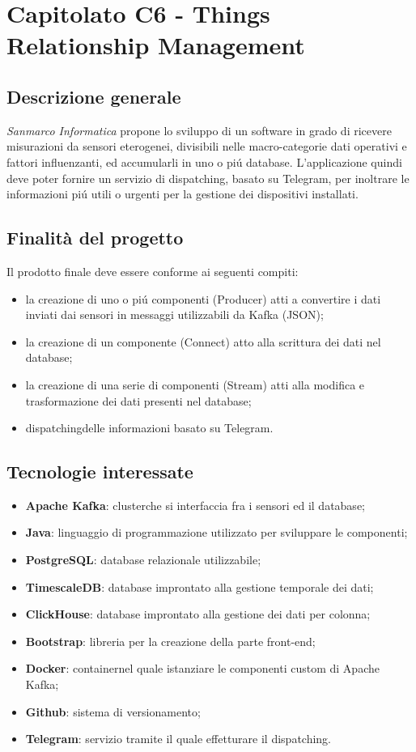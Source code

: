 \section{Capitolato C6 - Things Relationship Management}

\subsection{Descrizione generale}
\textit{Sanmarco Informatica} propone lo sviluppo di un software in grado di ricevere misurazioni da sensori eterogenei, divisibili nelle macro-categorie {dati operativi} e {fattori influenzanti}, ed accumularli in uno o piú database. L'applicazione quindi deve poter fornire un servizio di dispatching\glos, basato su Telegram, per inoltrare le informazioni piú utili o urgenti per la gestione dei dispositivi installati.

\subsection{Finalità del progetto}
Il prodotto finale deve essere conforme ai seguenti compiti:
\begin{itemize}
	\item la creazione di uno o piú componenti (Producer) atti a convertire i dati inviati dai sensori in messaggi utilizzabili da Kafka (JSON);
	\item la creazione di un componente (Connect) atto alla scrittura dei dati nel database;
	\item la creazione di una serie di componenti (Stream) atti alla modifica e trasformazione dei dati presenti nel database;
	\item dispatching\glos delle informazioni basato su Telegram.
\end{itemize}

\subsection{Tecnologie interessate}
\begin{itemize}
	\item \textbf{Apache Kafka}: cluster\glos che si interfaccia fra i sensori ed il database;
	\item \textbf{Java}: linguaggio di programmazione utilizzato per sviluppare le componenti;
	\item \textbf{PostgreSQL}: database relazionale utilizzabile;
	\item \textbf{TimescaleDB}: database improntato alla gestione temporale dei dati;
	\item \textbf{ClickHouse}: database improntato alla gestione dei dati per colonna;
	\item \textbf{Bootstrap}: libreria per la creazione della parte front-end\glos;
	\item \textbf{Docker}: container\glos nel quale istanziare le componenti custom di Apache Kafka;
	\item \textbf{Github}: sistema di versionamento\glos;
	\item \textbf{Telegram}: servizio tramite il quale effetturare il dispatching\glos.
\end{itemize}

